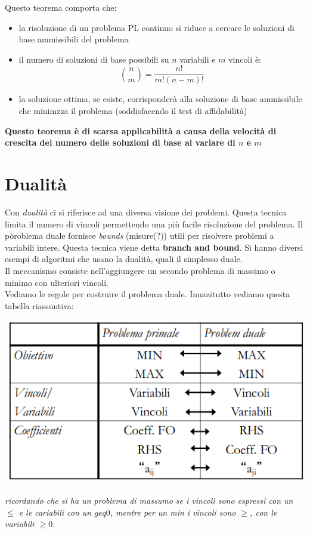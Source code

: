 \message{ !name(ro.tex)}\documentclass[a4paper,12pt, oneside]{book}
\begin{document}
Questo teorema comporta che:
\begin{itemize}
  \item la risoluzione di un problema PL continuo si riduce a cercare
  le soluzioni di base ammissibili del problema
  \item il numero di soluzioni di base possibili su $n$ variabili e
  $m$ vincoli è:
  \[{n\choose m}=\frac{n!}{m!(n-m)!}\]
  \item la soluzione ottima, se esiste, corrisponderà alla soluzione
  di base ammissibile che minimzza il problema (soddisfacendo il test
  di affidabilità)
\end{itemize}
\textbf{Questo teorema è di scarsa applicabilità a causa della
  velocità di crescita del numero delle soluzioni di base al variare
  di $n$ e $m$}
\chapter{Dualità}
Con \textit{dualità} ci si riferisce ad una diversa visione dei
problemi. Questa tecnica limita il numero di vincoli permettendo una
più facile risoluzione del problema. Il pòroblema duale fornisce
\textit{bounds} (misure(?)) utili per risolvere problemi a variabili
intere. Questa tecnica viene detta \textbf{branch and bound}. Si hanno
diversi esempi di algoritmi che usano la dualità, quali il simplesso
duale.\\
Il meccanismo consiste nell'aggiungere un secondo problema di massimo
o minimo con ulteriori vincoli.\\
Vediamo le regole per costruire il problema duale. Innazitutto vediamo
questa tabella riassuntiva:
\begin{center}
  \includegraphics[scale = 0.7]{img/dua.png}
\end{center}
\textit{ricordando che si ha un problema di massumo se i vincoli sono
  espressi con un $\leq$ e le cariabili con un $geq 0$, mentre per un
  min i vincoli sono $\geq$, con le variabili $\geq 0$}.\\
\end{document}
